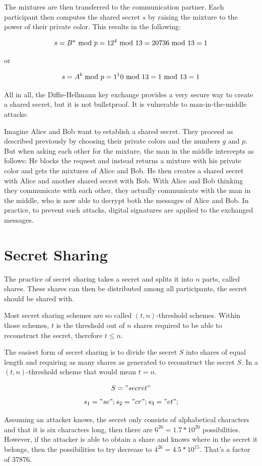 The mixtures are then transferred to the communication partner. Each
participant then computes the shared secret $s$ by raising the mixture
to the power of their private color. This results in the following:

$$s = B^a \ \text{mod}\ p = 12^4 \ \text{mod}\ 13 = 20736 \ \text{mod}\ 13 = 1$$

or

$$s = A^b \ \text{mod}\ p = 1^10 \ \text{mod}\ 13 = 1 \ \text{mod}\ 13 = 1$$

All in all, the Diffie-Hellmann key exchange provides a very secure way
to create a shared secret, but it is not bulletproof. It is vulnerable
to man-in-the-middle attacks:

Imagine Alice and Bob want to establish a shared secret. They proceed as
described previously by choosing their private colors and the numbers $g$
and $p$. But when asking each other for the mixture, the man in the middle
intercepts as follows: He blocks the request and instead returns a mixture
with his private color and gets the mixtures of Alice and Bob. He then
creates a shared secret with Alice and another shared secret with Bob. With
Alice and Bob thinking they communicate with each other, they actually
communicate with the man in the middle, who is now able to decrypt both
the messages of Alice and Bob. In practice, to prevent such attacks, digital
signatures are applied to the exchanged messages.

\cite{diffie1976new}

\section{Secret Sharing}

The practice of secret sharing takes a secret and splits it into $n$ parts,
called shares. These shares can then be distributed among all participants, the
secret should be shared with.

Most secret sharing schemes are so called $(t, n)$-threshold schemes. Within
those schemes, $t$ is the threshold out of $n$ shares required to be able to
reconstruct the secret, therefore $t \leq n$.

The easiest form of secret sharing is to divide the secret $S$ into shares of
equal length and requiring as many shares as generated to reconstruct the
secret $S$. In a $(t, n)$-threshold scheme that would mean $t = n$.

$$S = "secret"$$
$$s_1 = "se"; s_2 = "cr"; s_3 = "et";$$

Assuming an attacker knows, the secret only consists of alphabetical characters
and that it is six characters long, then there are $6^{26} = 1.7 * 10^{20}$
possibilities.  However, if the attacker is able to obtain a share and knows
where in the secret it belongs, then the possibilities to try decrease to
$4^{26} = 4.5 * 10^{15}$. That's a factor of $37876$.

